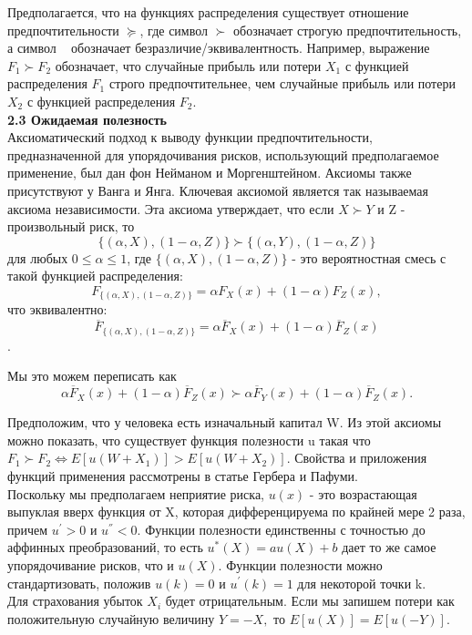 \documentclass[12pt,a4paper]{article}
\begin{document}
Предполагается, что на функциях распределения существует отношение предпочтительности $ \succeq$,  где символ $\succ$ обозначает строгую предпочтительность, а символ ~ обозначает безразличие/эквивалентность. Например, выражение $F_1 \succ F_2$ обозначает, что случайные прибыль или потери  $X_1$ с функцией распределения $F_1$  строго предпочтительнее, чем случайные прибыль или потери  $X_2$ с функцией распределения $F_2$.\\


{\bf 2.3 Ожидаемая полезность}\\
Аксиоматический подход к выводу функции предпочтительности, предназначенной для упорядочивания рисков, использующий предполагаемое применение, был дан фон Нейманом и Моргенштейном. Аксиомы также присутствуют у Ванга и Янга. Ключевая аксиомой является так называемая аксиома независимости. Эта аксиома утверждает, что если $X \succ Y$ и Z - произвольный риск, то
$$\{(\alpha,X),(1-\alpha,Z)\} \succ \{(\alpha,Y),(1-\alpha,Z)\} $$
для любых $0 \leq \alpha \leq 1 $, где $ \{ (\alpha,X),(1-\alpha,Z) \}$ - это вероятностная смесь с такой функцией распределения:
$$F_{  \{(\alpha,X),(1-\alpha,Z)\} } = \alpha F_X(x) + (1-\alpha)F_Z(x),$$
что эквивалентно:
$$\overline F_{  \{(\alpha,X),(1-\alpha,Z)\} } = \alpha {\overline  F}_X(x) + (1-\alpha ){ \overline F} _Z(x)$$.

Мы это можем переписать как 
$$\alpha {\overline  F}_X(x) + (1-\alpha ){ \overline F} _Z(x) \succ \alpha {\overline  F}_Y(x) + (1-\alpha ){ \overline F} _Z(x).$$

Предположим, что у человека есть изначальный капитал W. Из этой аксиомы можно показать, что существует функция полезности u такая что 
$F_1 \succ F_2 \Leftrightarrow  E \left[ u(W + X_1) \right]  >  E \left[u(W + X_2) \right] .$  
Свойства и приложения функций применения рассмотрены в статье Гербера и Пафуми.\\
Поскольку мы предполагаем неприятие риска, $u(x)$ - это возрастающая выпуклая вверх функция от X,  которая дифференцируема по крайней мере 2 раза, причем $u^{'} > 0$ и $u^{''} < 0.$ Функции полезности единственны с точностью до аффинных преобразований, то есть $u^{*}(X) = au(X) + b $ дает то же самое упорядочивание рисков, что и $u(X).$ Функции полезности можно стандартизовать, положив $u(k)=0$ и $u^{'}(k) = 1$ для некоторой точки k.\\
Для страхования убыток $X_i$ будет отрицательным. Если мы запишем потери как положительную случайную величину $Y=-X,$ то $ E \left[ u(X) \right]  = E  \left[ u(-Y) \right] . $\\
\end{document}
